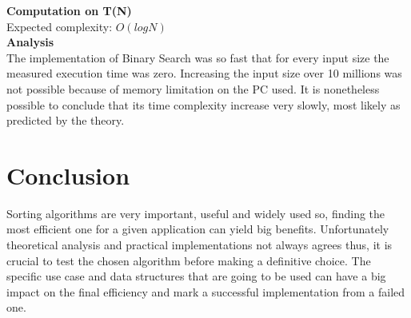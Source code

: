 \documentclass{article}
\begin{document}
\begin{center}
\end{center}


\textbf{Computation on T(N)}\\

Expected complexity: $O(logN)$\\

\textbf{Analysis}\\

The implementation of Binary Search was so fast that for every input size the measured execution time was zero. Increasing the input size over 10 millions was not possible because of memory limitation on the PC used. It is nonetheless possible to conclude that its time complexity increase very slowly, most likely as predicted by the theory.

\newpage
\section{Conclusion}

Sorting algorithms are very important, useful and widely used so, finding the most efficient one for a given application can yield big benefits. Unfortunately theoretical analysis and practical implementations not always agrees thus, it is crucial to test the chosen algorithm before making a definitive choice. The specific use case and data structures that are going to be used can have a big impact on the final efficiency and mark a successful implementation from a failed one.

\newpage

\nocite{*}
\printbibliography[] %
\end{document}
